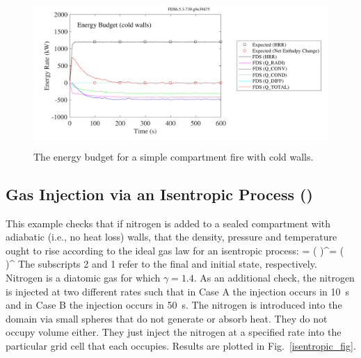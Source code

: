 \documentclass[11pt]{book}
\begin{document}
\begin{figure}[ht]
\centering
\includegraphics[height=2.2in]{SCRIPT_FIGURES/energy_budget_cold_walls}
\caption[The {\ct energy\_budget\_cold\_walls} test case]{The energy budget for a simple compartment fire with cold walls.}
\label{energy_budget_cold_walls_fig}
\end{figure}


\subsection{Gas Injection via an Isentropic Process (\texorpdfstring{}{isentropic})}
\label{isentropic}

This example checks that if nitrogen is added to a sealed compartment with adiabatic (i.e., no heat loss) walls, that the density, pressure and temperature ought to rise according to the ideal gas law for an isentropic process: \be {} = \left(  \right)^\gamma = \left(  \right)^{}  \ee The subscripts 2 and 1 refer to the final and initial state, respectively. Nitrogen is a diatomic gas for which $\gamma=1.4$. As an additional check, the nitrogen is injected at two different rates such that in Case A the injection occurs in 10~s and in Case B the injection occurs in 50~s. The nitrogen is introduced into the domain via small spheres that do not generate or absorb heat. They do not occupy volume either. They just inject the nitrogen at a specified rate into the particular grid cell that each occupies.  Results are plotted in Fig.~\ref{isentropic_fig}.
\end{document}
